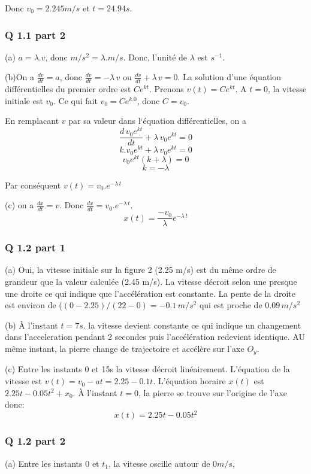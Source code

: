 \documentclass[]{book}
\theoremstyle{definition}
\begin{document}
Donc $v_0 = 2.245m/s$ et $t=24.94s$. 

\subsubsection*{Q 1.1 part 2}
(a) $a = \lambda . v$, donc $m/s^2 = \lambda . m/s$. Donc, l'unit\'e de $\lambda$ est $s^{-1}$.


(b)On a $\frac{dv}{dt} = a$, donc $\frac{dv}{dt} = -\lambda\, v$ ou $\frac{dv}{dt} + \lambda\, v = 0$. 
La solution d'une \'equation diff\'erentielles du premier ordre est $Ce^{kt}$. 
Prenons $v(t) = Ce^{kt}$. A $t=0$, la vitesse initiale
est $v_0$. Ce qui fait $v_0 = Ce^{k.0}$, donc $C = v_0$. 


En remplacant $v$ par sa valeur dans l`\'equation diff\'erentielles, on a 
$$ \frac{d\, v_0e^{kt}}{dt} + \lambda\, v_0e^{kt} = 0$$
$$ k.v_0e^{kt} + \lambda\, v_0e^{kt} = 0$$
$$ v_0e^{kt}(k + \lambda) = 0$$
$$ k = -\lambda $$

Par cons\'equent $v(t) = v_0.e^{-\lambda\, t}$

(c) on a $\frac{dx}{dt} = v$. Donc $\frac{dx}{dt} = v_0.e^{-\lambda\, t}$. 
$$x(t) =  \frac{-v_0}{\lambda}e^{-\lambda\, t}$$

\subsubsection*{Q 1.2 part 1}
(a) Oui, la vitesse initiale sur la figure 2 (2.25 m/s) est du m\^eme ordre de grandeur que la 
valeur calcul\'ee (2.45 m/s). La vitesse d\'ecroit selon une presque une droite ce qui indique 
que l'acc\'el\'eration est constante. La pente de la droite est environ de ($(0-2.25)/(22-0) = -0.1\,m/s^2$
qui est proche de $0.09\,m/s^2$


(b) \`A l'instant $t=7s$. la vitesse devient constante ce qui indique un changement dans l'acceleration
pendant 2 secondes puis l'acc\'el\'eration redevient identique. AU m\^eme instant, 
la pierre change de trajectoire et acc\'el\`ere sur l'axe $O_y$.


(c) Entre les instants 0 et 15s la vitesse d\'ecroit lin\'eairement. L'\'equation de la vitesse 
est $v(t) = v_0 - at = 2.25 - 0.1t$. L'\'equation horaire $x(t)$ est $2.25t - 0.05t^2 + x_0$. 
\`A l'instant $t = 0$, la pierre se trouve sur l'origine de l'axe donc:
$$ x(t) = 2.25t - 0.05t^2$$
 
\subsubsection*{Q 1.2 part 2}
(a) Entre les instants 0 et $t_1$, la vitesse oscille autour de $0m/s$,
\end{document}
